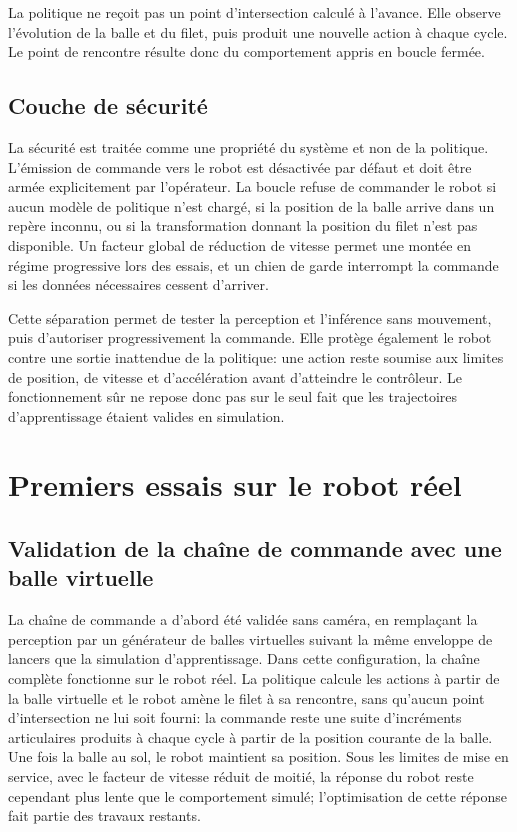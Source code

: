 \documentclass[a4paper,11pt]{report}
\begin{document}
La politique ne reçoit pas un point d'intersection calculé à l'avance. Elle
observe l'évolution de la balle et du filet, puis produit une nouvelle action à
chaque cycle. Le point de rencontre résulte donc du comportement appris en
boucle fermée.

\subsection{Couche de sécurité}

La sécurité est traitée comme une propriété du système et non de la politique. L'émission de commande vers le robot est désactivée par défaut et doit être armée explicitement par l'opérateur. La boucle refuse de commander le robot si aucun modèle de politique n'est chargé, si la position de la balle arrive dans un repère inconnu, ou si la transformation donnant la position du filet n'est pas disponible. Un facteur global de réduction de vitesse permet une montée en régime progressive lors des essais, et un chien de garde interrompt la commande si les données nécessaires cessent d'arriver.

Cette séparation permet de tester la perception et l'inférence sans mouvement,
puis d'autoriser progressivement la commande. Elle protège également le robot
contre une sortie inattendue de la politique: une action reste soumise aux
limites de position, de vitesse et d'accélération avant d'atteindre le
contrôleur. Le fonctionnement sûr ne repose donc pas sur le seul fait que les
trajectoires d'apprentissage étaient valides en simulation.

\section{Premiers essais sur le robot réel}

\subsection{Validation de la chaîne de commande avec une balle virtuelle}

La chaîne de commande a d'abord été validée sans caméra, en remplaçant la perception par un générateur de balles virtuelles suivant la même enveloppe de lancers que la simulation d'apprentissage. Dans cette configuration, la chaîne complète fonctionne sur le robot réel. La politique calcule les actions à partir de la balle virtuelle et le robot amène le filet à sa rencontre, sans qu'aucun point d'intersection ne lui soit fourni: la commande reste une suite d'incréments articulaires produits à chaque cycle à partir de la position courante de la balle. Une fois la balle au sol, le robot maintient sa position. Sous les limites de mise en service, avec le facteur de vitesse réduit de moitié, la réponse du robot reste cependant plus lente que le comportement simulé; l'optimisation de cette réponse fait partie des travaux restants.
\end{document}
